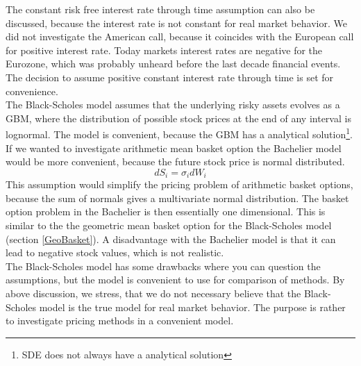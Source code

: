 The constant risk free interest rate through time assumption can also be discussed, because the interest rate is not constant for real market behavior. We did not investigate the American call, because it coincides with the European call for positive interest rate. Today markets interest rates are negative for the Eurozone, which was probably unheard before the last decade financial events. The decision to assume positive constant interest rate through time is set for convenience.\\

The Black-Scholes model assumes that the underlying risky assets evolves as a GBM, where the distribution of possible stock prices at the end of any interval is lognormal. The model is convenient, because the GBM has a analytical solution\footnote{SDE does not always have a analytical solution}. If we wanted to investigate arithmetic mean basket option the Bachelier model would be more convenient, because the future stock price is normal distributed. 
\begin{equation*}
dS_i=\sigma_i dW_i
\end{equation*}
This assumption would simplify the pricing problem of arithmetic basket options, because the sum of normals gives a multivariate normal distribution. The basket option problem in the Bachelier is then essentially one dimensional. This is similar to the the geometric mean basket option for the Black-Scholes model (section \ref{GeoBasket}). A disadvantage with the Bachelier model is that it can lead to negative stock values, which is not realistic.\\

The Black-Scholes model has some drawbacks where you can question the assumptions, but the model is convenient to use for comparison of methods. By above discussion, we stress, that we do not necessary believe that the Black-Scholes model is the true model for real market behavior. The purpose is rather to investigate pricing methods in a convenient model.

